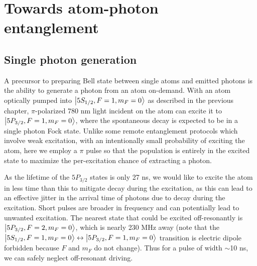 \chapter{Towards atom-photon entanglement}\label{ch:atomphoton}


\section{Single photon generation}
A precursor to preparing Bell state between single atoms and emitted photons is the ability to generate a photon from an atom on-demand. With an atom optically pumped into $\ket{5S_{1/2},F=1,m_F=0}$ as described in the previous chapter, $\pi$-polarized 780 nm light incident on the atom can excite it to $\ket{5P_{3/2},F=1,m_F=0}$, where the spontaneous decay is expected to be in a single photon Fock state. Unlike some remote entanglement protocols which involve weak excitation\cite{cabrillo1999creation}, with an intentionally small probability of exciting the atom, here we employ a $\pi$ pulse so that the population is entirely in the excited state to maximize the per-excitation chance of extracting a photon. 


As the lifetime of the $5P_{3/2}$ states is only 27 ns, we would like to excite the atom in less time than this to mitigate decay during the excitation, as this can lead to an effective jitter in the arrival time of photons due to decay during the excitation. Short pulses are broader in frequency and can potentially lead to unwanted excitation. The nearest state that could be excited off-resonantly is $\ket{5P_{3/2},F=2,m_F=0}$, which is nearly 230 MHz away (note that the $\ket{5S_{1/2},F=1,m_F=0} \leftrightarrow \ket{5P_{3/2},F=1,m_F=0}$ transition is electric dipole forbidden because $F$ and $m_F$ do not change). Thus for a pulse of width $\sim$10 ns, we can safely neglect off-resonant driving.


